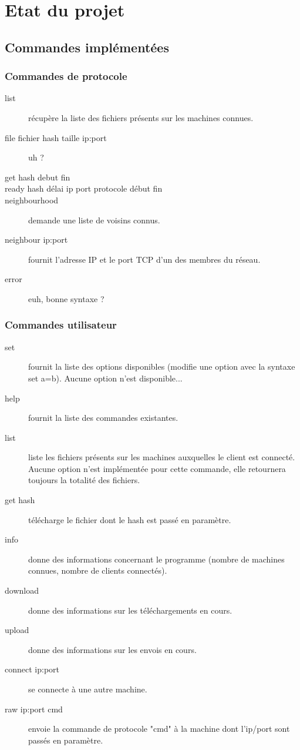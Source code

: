 \chapter{Etat du projet}

\section{Commandes implémentées}

\subsection{Commandes de protocole}
\begin{description}
    \item[list] récupère la liste des fichiers présents sur les machines
connues.
    \item[file fichier hash taille ip:port] uh ?
    \item[get hash debut fin] 
    \item[ready hash délai ip port protocole début fin]
    \item[neighbourhood] demande une liste de voisins connus.
    \item[neighbour ip:port] fournit l'adresse IP et le port TCP d'un des
membres du réseau.
    \item[error] euh, bonne syntaxe ?
\end{description}



\subsection{Commandes utilisateur}
\begin{description}
    \item[set] fournit la liste des options disponibles (modifie une option avec
la syntaxe set a=b). Aucune option n'est disponible...
    \item[help] fournit la liste des commandes existantes.
    \item[list] liste les fichiers présents sur les machines auxquelles le
client est connecté. Aucune option n'est implémentée pour cette commande, elle
retournera toujours la totalité des fichiers.
    \item[get hash] télécharge le fichier dont le hash est passé en paramètre. 
    \item[info] donne des informations concernant le programme (nombre de
machines connues, nombre de clients connectés).
    \item[download] donne des informations sur les téléchargements en cours.
    \item[upload] donne des informations sur les envois en cours.
    \item[connect ip:port] se connecte à une autre machine.
    \item[raw ip:port cmd] envoie la commande de protocole "cmd" à la machine
dont l'ip/port sont passés en paramètre.
\end{description}




